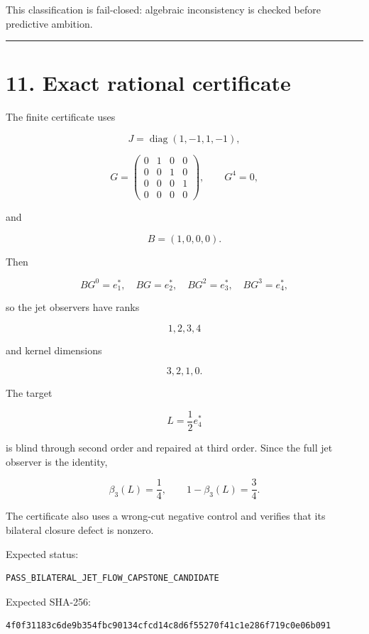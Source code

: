This classification is fail-closed: algebraic inconsistency is checked before
predictive ambition.

\begin{center}\rule{0.5\linewidth}{0.5pt}\end{center}

\hypertarget{exact-rational-certificate}{%
\section{11. Exact rational certificate}\label{exact-rational-certificate}}

The finite certificate uses

\[
J=\operatorname{diag}(1,-1,1,-1),
\]

\[
G=
\begin{pmatrix}
0&1&0&0\\
0&0&1&0\\
0&0&0&1\\
0&0&0&0
\end{pmatrix},
\qquad G^4=0,
\]

and

\[
B=(1,0,0,0).
\]

Then

\[
BG^0=e_1^*,\quad BG=e_2^*,\quad BG^2=e_3^*,\quad BG^3=e_4^*,
\]

so the jet observers have ranks

\[
1,2,3,4
\]

and kernel dimensions

\[
3,2,1,0.
\]

The target

\[
L=\frac12e_4^*
\]

is blind through second order and repaired at third order. Since the full jet
observer is the identity,

\[
\beta_3(L)=\frac14,
\qquad
1-\beta_3(L)=\frac34.
\]

The certificate also uses a wrong-cut negative control and verifies that its
bilateral closure defect is nonzero.

Expected status:

\begin{verbatim}
PASS_BILATERAL_JET_FLOW_CAPSTONE_CANDIDATE
\end{verbatim}

Expected SHA-256:

\begin{verbatim}
4f0f31183c6de9b354fbc90134cfcd14c8d6f55270f41c1e286f719c0e06b091
\end{verbatim}


